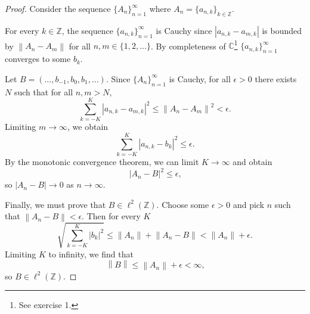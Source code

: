 \documentclass[oneside]{article}
\newcommand\abs[1]{\left|#1\right|}
\newcommand\norm[1]{\left\|#1\right\|}
\newcommand\bbC{\mathbb{C}}
\newcommand\bbZ{\mathbb{Z}}
\begin{document}
  \begin{proof}
    Consider the sequence $\{A_n\}_{n=1}^\infty$ where $A_n = \{a_{n,k}\}_{k\in\bbZ}$.

    For every $k \in \bbZ$, the sequence $\{a_{n,k}\}_{n=1}^\infty$ is Cauchy since $\abs{a_{n,k} - a_{m,k}}$ is bounded by $\norm{A_n - A_m}$ for all $n, m \in \{1, 2, \dots \}$. By completeness of $\bbC$\footnote{See exercise 1.} $\{a_{n,k}\}_{n=1}^\infty$ converges to some $b_k$.

    Let $B = (\dots, b_{-1}, b_0, b_1, \dots)$. Since $\{A_n\}_{n=1}^\infty$ is Cauchy, for all $\epsilon>0$ there exists $N$ such that for all $n, m > N$, \[
      \sum_{k=-K}^K \abs{a_{n,k} - a_{m,k}}^2
      \leq \norm{A_n - A_m}^2 < \epsilon \text{.}
    \] Limiting $m \to \infty$, we obtain \[
      \sum_{k=-K}^K \abs{a_{n,k} - b_k}^2
      \leq \epsilon \text{.}
    \] By the monotonic convergence theorem, we can limit $K \to \infty$ and obtain\[
      \abs{A_n - B}^2 \leq \epsilon \text{,}
    \] so $\abs{A_n - B} \to 0$ as $n \to \infty$.

    Finally, we must prove that $B \in \ell^2(\bbZ)$. Choose some $\epsilon > 0$ and pick $n$ such that $\norm{A_n - B} < \epsilon$. Then for every $K$\[
      \sqrt{\sum_{k=-K}^K \abs{b_k}^2} \leq \norm{A_n} + \norm{A_n - B} < \norm{A_n} + \epsilon \text{.}
    \] Limiting $K$ to infinity, we find that \[
      \norm{B} \leq \norm{A_n} + \epsilon < \infty \text{,}
    \] so $B \in \ell^2(\bbZ)$.
  \end{proof}
\end{document}
